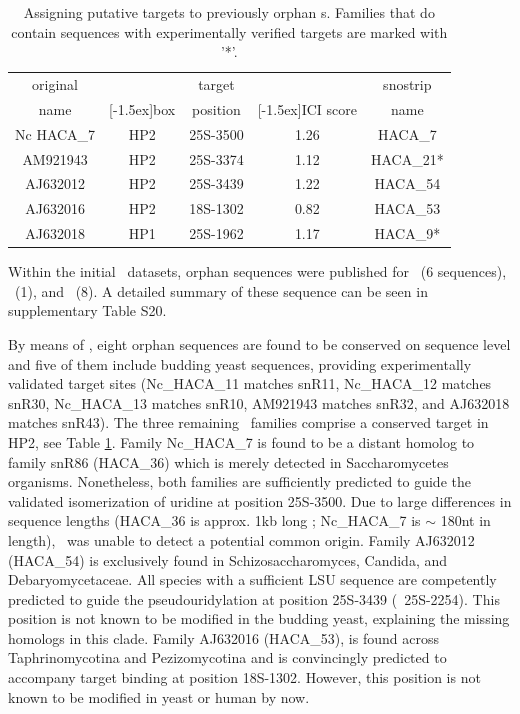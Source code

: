 \begin{table}
  \caption[Potential targets for orphan \haca s.]{Assigning putative targets to previously
    orphan \haca s. Families that do contain sequences with
    experimentally verified targets are marked with '*'. }
  \label{tab:orphan_hacas_short}
  \begin{center}
    \begin{footnotesize}
      \begin{tabular}{c|c|c|c|c}
        original&&target&&snostrip\\
        name&\raisebox{1.5ex}[-1.5ex]{box}&position&\raisebox{1.5ex}[-1.5ex]{ICI
            score}&name\\
        \hline
        Nc HACA\_7&HP2&25S-3500&1.26&HACA\_7\\
        AM921943&HP2&25S-3374&1.12&HACA\_21*\\
        AJ632012&HP2&25S-3439&1.22&HACA\_54\\
        AJ632016&HP2&18S-1302&0.82&HACA\_53\\
        AJ632018&HP1&25S-1962&1.17&HACA\_9*\\
      \end{tabular}
    \end{footnotesize}
  \end{center}
\end{table}

Within the initial \haca\ datasets, orphan sequences were published
for \ncr\ (6 sequences), \afu\ (1), and \spo\ (8).  A detailed summary
of these sequence can be seen in supplementary Table S20.

By means of \snostrip, eight orphan sequences are found to be
conserved on sequence level and five of them include budding yeast
sequences, providing experimentally validated target sites
(Nc\_HACA\_11 matches snR11, Nc\_HACA\_12 matches snR30, Nc\_HACA\_13
matches snR10, AM921943 matches snR32, and AJ632018 matches
snR43). The three remaining \sno\ families comprise a conserved target
in HP2, see Table \ref{tab:orphan_hacas_short}. Family Nc\_HACA\_7 is
found to be a distant homolog to family snR86 (HACA\_36) which is
merely detected in Saccharomycetes organisms. Nonetheless, both
families are sufficiently predicted to guide the validated
isomerization of uridine at position 25S-3500. Due to large
differences in sequence lengths (HACA\_36 is approx. 1kb long ;
Nc\_HACA\_7 is $\sim$ 180nt in length), \snostrip\ was unable to
detect a potential common origin. Family AJ632012 (HACA\_54) is
exclusively found in Schizosaccharomyces, Candida, and
Debaryomycetaceae. All species with a sufficient LSU sequence are
competently predicted to guide the pseudouridylation at position
25S-3439 (\sce\ 25S-2254). This position is not known to be modified
in the budding yeast, explaining the missing homologs in this
clade. Family AJ632016 (HACA\_53), is found across Taphrinomycotina
and Pezizomycotina and is convincingly predicted to accompany target
binding at position 18S-1302. However, this position is not known to
be modified in yeast or human by now.

